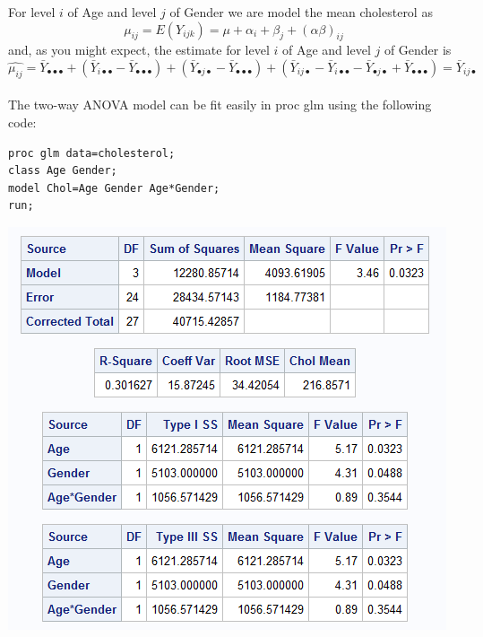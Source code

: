 \newpage

For level $i$ of Age and level $j$ of Gender we are model the mean cholesterol as
$$\mu_{ij}=E(Y_{ijk})=\mu+\alpha_i+\beta_j+(\alpha\beta)_{ij}$$
and, as you might expect, the estimate for level $i$ of Age and level $j$ of Gender is
$$\hat{\mu_{ij}}=\bar{Y}_{\bullet\bullet\bullet}+(\bar{Y}_{i\bullet\bullet}-\bar{Y}_{\bullet\bullet\bullet})+(\bar{Y}_{\bullet j \bullet}-\bar{Y}_{\bullet\bullet\bullet})+(\bar{Y}_{ij\bullet}-\bar{Y}_{i\bullet\bullet}-\bar{Y}_{\bullet j\bullet}+\bar{Y}_{\bullet\bullet\bullet}) =\bar{Y}_{ij\bullet}$$~\\


The two-way ANOVA model can be fit easily in proc glm using the following code:
\begin{small}
\begin{verbatim}
proc glm data=cholesterol;
class Age Gender;
model Chol=Age Gender Age*Gender; 
run;
\end{verbatim}
\end{small}

\begin{flushleft}
\includegraphics[scale=0.75]{CholTwoWay}
\end{flushleft}

